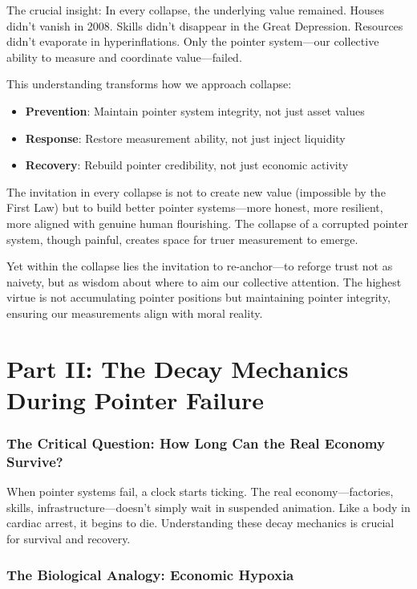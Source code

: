 \documentclass[11pt,oneside]{book}
\begin{document}
The crucial insight: In every collapse, the underlying value remained. Houses didn't vanish in 2008. Skills didn't disappear in the Great Depression. Resources didn't evaporate in hyperinflations. Only the pointer system—our collective ability to measure and coordinate value—failed.

This understanding transforms how we approach collapse:
\begin{itemize}
\item \textbf{Prevention}: Maintain pointer system integrity, not just asset values
\item \textbf{Response}: Restore measurement ability, not just inject liquidity
\item \textbf{Recovery}: Rebuild pointer credibility, not just economic activity
\end{itemize}

The invitation in every collapse is not to create new value (impossible by the First Law) but to build better pointer systems—more honest, more resilient, more aligned with genuine human flourishing. The collapse of a corrupted pointer system, though painful, creates space for truer measurement to emerge.

Yet within the collapse lies the invitation to re-anchor—to reforge trust not as naivety, but as wisdom about where to aim our collective attention. The highest virtue is not accumulating pointer positions but maintaining pointer integrity, ensuring our measurements align with moral reality.

\section{Part II: The Decay Mechanics During Pointer Failure}

\subsubsection{The Critical Question: How Long Can the Real Economy Survive?}

When pointer systems fail, a clock starts ticking. The real economy—factories, skills, infrastructure—doesn't simply wait in suspended animation. Like a body in cardiac arrest, it begins to die. Understanding these decay mechanics is crucial for survival and recovery.

\subsubsection{The Biological Analogy: Economic Hypoxia}
\end{document}
